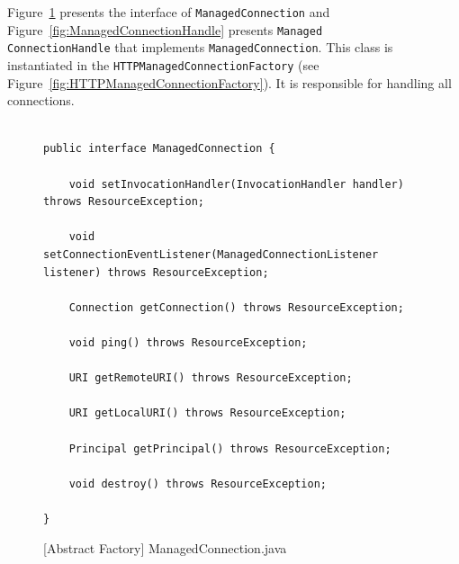 Figure~\ref{fig:ManagedConnection} presents the interface of \texttt{ManagedConnection} and Figure~\ref{fig:ManagedConnectionHandle} presents \texttt{Managed\\ConnectionHandle} that implements \texttt{ManagedConnection}. This class is instantiated in the \texttt{HTTPManagedConnectionFactory} (see Figure~\ref{fig:HTTPManagedConnectionFactory}). It is responsible for handling all connections.

\begin{figure}[htb]
\centering
\lstset{language=Java, basicstyle=\scriptsize, stepnumber=1, showspaces=false, showstringspaces=false,breaklines=true}
\begin{lstlisting}

public interface ManagedConnection {

    void setInvocationHandler(InvocationHandler handler) throws ResourceException;

    void setConnectionEventListener(ManagedConnectionListener listener) throws ResourceException;

    Connection getConnection() throws ResourceException;

    void ping() throws ResourceException;

    URI getRemoteURI() throws ResourceException;

    URI getLocalURI() throws ResourceException;

    Principal getPrincipal() throws ResourceException;

    void destroy() throws ResourceException;

}
\end{lstlisting}
\caption{[Abstract Factory] ManagedConnection.java}
\label{fig:ManagedConnection}
\end{figure}
\FloatBarrier


